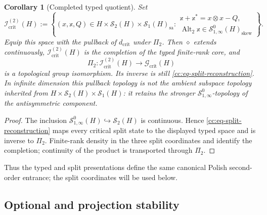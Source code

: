 \documentclass[10pt,reqno]{amsart}
\theoremstyle{plain}
\newtheorem{corollary}[theorem]{Corollary}
\theoremstyle{definition}
\theoremstyle{remark}
\begin{document}
\begin{corollary}[Completed typed quotient]
\label{cc:cor-critical-typed-completion}
Set
\[
 \mathscr I^{(2)}_{\mathrm{crit}}(H)
 :=
 \left\{
 (x,\mathbb x,Q)\in
 H\times\mathcal S_2(H)\times\mathcal S_1(H)_{\mathrm{sa}}:
 \begin{array}{l}
 \mathbb x+\mathbb x^*=x\otimes x-Q,\\
 \operatorname{Alt}_2\mathbb x\in
 \mathcal S^0_{1,\infty}(H)_{\mathrm{skew}}
 \end{array}
 \right\}.
\]
Equip this space with the pullback of \(d_{\mathrm{crit}}\) under
\(\Pi_2\).  Then \(\diamond\) extends continuously,
\(\mathscr I^{(2)}_{\mathrm{crit}}(H)\) is the completion of the typed
finite-rank core, and
\[
 \Pi_2:\mathscr I^{(2)}_{\mathrm{crit}}(H)
 \longrightarrow\mathscr G_{\mathrm{crit}}(H)
\]
is a topological group isomorphism.  Its inverse is still
\eqref{cc:eq-split-reconstruction}.
In infinite dimension this pullback topology is not the ambient subspace
topology inherited from
\(H\times\mathcal S_2(H)\times\mathcal S_1(H)\): it retains the stronger
\(\mathcal S^0_{1,\infty}\)-topology of the antisymmetric component.
\end{corollary}

\begin{proof}
The inclusion
\(\mathcal S^0_{1,\infty}(H)\hookrightarrow\mathcal S_2(H)\) is continuous.
Hence \eqref{cc:eq-split-reconstruction} maps every critical split state to
the displayed typed space and is inverse to \(\Pi_2\).  Finite-rank density
in the three split coordinates and
 identify the completion; continuity
of the product is transported through \(\Pi_2\).
\end{proof}

Thus the typed and split presentations define the same canonical Polish
second-order entrance; the split coordinates will be used below.

\subsection{Optional and projection stability}
\label{cc:subsec-critical-optional-levy}
\end{document}
